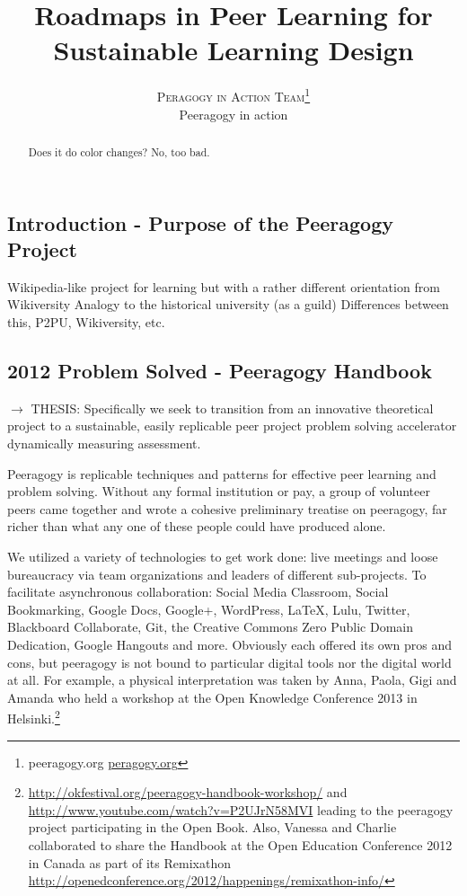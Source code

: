 \documentclass[twoside]{article}
\title{\vspace{-15mm}%
	\fontsize{24pt}{10pt}\selectfont
	\textbf{Roadmaps in Peer Learning for Sustainable Learning
Design}}
\author{%
	\large
	\textsc{Peragogy in Action Team}\thanks{peeragogy.org \href{http://www.peeragogy,.org}{peragogy.org}} \\[2mm]
	\normalsize	Peeragogy in action\\
	\vspace{-5mm}
	}
\date{}
\begin{document}
\maketitle
\thispagestyle{fancy}

\begin{abstract}
\noindent Does it do color changes?  No, too bad.
\end{abstract}
	
\begin{multicols}{2}

\section{Introduction - Purpose of the Peeragogy Project}


Wikipedia-like project for learning
but with a rather different orientation from Wikiversity
Analogy to the historical university (as a guild)
Differences between this, P2PU, Wikiversity, etc.

\subsection{2012 Problem Solved - Peeragogy Handbook}

$\rightarrow$ THESIS: Specifically we seek to transition from an innovative theoretical project to a sustainable, easily replicable peer project problem solving accelerator dynamically measuring assessment.

Peeragogy is replicable techniques and patterns for effective peer learning and problem solving. Without any formal institution or pay, a group of volunteer peers came together and wrote a cohesive preliminary treatise on peeragogy, far richer than what any one of these people could have produced alone.

We utilized a variety of technologies to get work done: live meetings and loose bureaucracy via team organizations and leaders of different sub-projects. To facilitate asynchronous collaboration: Social Media Classroom, Social Bookmarking, Google Docs, Google+, WordPress, LaTeX, Lulu, Twitter, Blackboard Collaborate, Git, the Creative Commons Zero Public Domain Dedication, Google Hangouts and more. Obviously each offered its own pros and cons, but peeragogy is not bound to particular digital tools nor the digital world at all. For example, a physical interpretation was taken by Anna, Paola, Gigi and Amanda who held a workshop at the Open Knowledge Conference 2013 in Helsinki.\footnote{ \url{http://okfestival.org/peeragogy-handbook-workshop/} and \url{http://www.youtube.com/watch?v=P2UJrN58MVI} leading to the peeragogy project participating in the Open Book. Also, Vanessa and Charlie collaborated to share the Handbook at the Open Education Conference 2012 in Canada as part of its Remixathon \url{http://openedconference.org/2012/happenings/remixathon-info/}}


\end{multicols}
\end{document}
